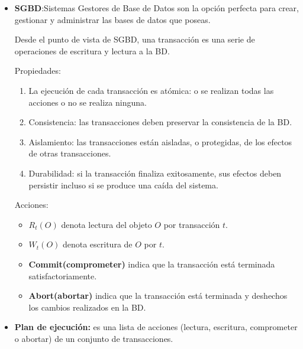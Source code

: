 \documentclass{templateNote}
\begin{document}
\begin{itemize}
    \item \textbf{SGBD}:Sistemas Gestores de Base de Datos son la opción perfecta para crear, gestionar y administrar las bases de datos que poseas.
    
    Desde el punto de vista de SGBD, una transacción es una serie de operaciones de escritura y lectura a la BD.

    Propiedades:
    \begin{enumerate}
        \item La ejecución de cada transacción es atómica: o se realizan todas las acciones o no se realiza ninguna.
        \item Consistencia: las transacciones deben preservar la consistencia de la BD.
        \item Aislamiento: las transacciones están aisladas, o protegidas, de los efectos de otras transacciones.
        \item Durabilidad: si la transacción finaliza exitosamente, sus efectos deben persistir incluso si se produce una caída del sistema.
    \end{enumerate}

    Acciones:
    \begin{itemize}
        \item \textbf{$R_t(O)$} denota lectura del objeto $O$ por transacción $t$.
        \item \textbf{$W_t(O)$} denota escritura de $O$ por $t$.
        \item \textbf{Commit(comprometer)} indica que la transacción está terminada satisfactoriamente.
        \item \textbf{Abort(abortar)} indica que la transacción está terminada y deshechos los cambios realizados en la BD.
    \end{itemize}

    \item \textbf{Plan de ejecución:} es una lista de acciones (lectura, escritura, comprometer o abortar) de un conjunto de transacciones.


\end{itemize}
\end{document}
